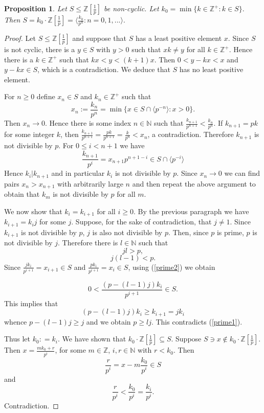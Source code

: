 \documentclass[11 pt, leqno, hidelinks]{amsart}%
\theoremstyle{plain}
\newtheorem{proposition}[theorem]{Proposition}
\numberwithin{equation}{section}
\newcommand{\N}{\mathbb{N}}
\newcommand{\Z}{\mathbb{Z}}
\begin{document}
\begin{proposition}\label{prime} Let $S\leq \mathbb Z[\frac{1}{p}]$ be non-cyclic.  Let $k_0=\min\{ k\in \Z^+: k\in S \}.$  Then $S=k_0\cdot \mathbb Z[\frac{1}{p}] = \langle  \frac{k_0}{p^n}:n=0,1,... \rangle.$
\end{proposition}
\begin{proof} Let $S\leq \mathbb Z[\frac{1}{p}]$ and suppose that $S$ has a least positive element $x$. Since $S$ is not cyclic, there is a $y\in S$ with $y>0$ such that $xk\neq y$ for all $k\in\Z^+.$  Hence there is a $k\in \Z^+$ such that $kx<y<(k+1)x.$  Then $0<y-kx<x$ and $y-kx\in S$, which is a contradiction.  We deduce that $S$ has no least positive element.

For $n\geq 0$ define $x_n\in S$ and $k_n\in\Z^+$ such that
\begin{equation*}
x_n:=\frac{k_n}{p^n} = \min\{  x\in S\cap \langle p^{-n} \rangle:x>0 \}.
\end{equation*}
Then $x_n\to 0 .$ Hence there is some index $n\in \N$ such that $\frac{k_{n+1}}{p^{n+1}}<\frac{k_n}{p^n}.$  If $k_{n+1}=pk$ for some integer $k$, then $\frac{k_{n+1}}{p^{n+1}}=\frac{pk}{p^{n+1}}=\frac{k}{p^n}<x_n$, a contradiction. Therefore $k_{n+1}$ is not divisible by $p$.
For $0\leq i<n+1$ we have
\begin{equation*}
\frac{k_{n+1}}{p^i}=x_{n+1}p^{n+1-i}\in S\cap \langle p^{-i} \rangle
\end{equation*}
Hence $k_i|k_{n+1}$ and in particular $k_i$ is not divisible by $p$.  Since $x_n\rightarrow 0$ we can find pairs $x_n>x_{n+1}$ with arbitrarily large $n$  and then repeat the above argument to obtain that $k_m$ is not divisible by $p$ for all $m$.



We now show that $k_i=k_{i+1}$ for all $i\geq 0.$
By the previous paragraph we have $k_{i+1}=k_ij$ for some $j.$  Suppose, for the sake of contradiction, that $j\neq 1$.  Since $k_{i+1}$ is not divisible by $p$, $j$ is also not divisible by $p$.  Then, since $p$ is prime, $p$ is not divisible by $j$. Therefore there is $l\in \mathbb N$ such that
\begin{equation}\label{prime1} jl > p,
\end{equation}
\begin{equation}\label{prime2} j(l-1) < p.
\end{equation}
Since $\frac{jk_i}{p^{i+1}} = x_{i+1}\in S$ and $\frac{pk_i}{p^{i+1}} = x_i\in S$, using (\ref{prime2}) we obtain

$$0<\frac{(p-(l-1)j)k_i}{p^{i+1}} \in S.$$
This implies that
$$(p-(l-1)j)k_i \ge k_{i+1} = jk_i$$ whence  $p - (l-1)j \ge j$ and we obtain $p\ge lj$. This contradicts (\ref{prime1}).

Thus let $k_0: = k_i$. We have shown that $k_0\cdot \mathbb Z[\frac{1}{p}] \subseteq S$. Suppose $S\ni x \notin k_0\cdot \mathbb Z[\frac{1}{p}]$. Then $x = \frac{mk_0+r}{p^i}$, for some $m\in \mathbb Z$, $i, r\in \mathbb N$ with $r<k_0$. Then
$$\frac{r}{p^i} = x - m \frac{k_0}{p^i} \in S $$ and $$\frac{r}{p^i}<\frac{k_0}{p^i} = \frac{k_i}{p^i}.$$ Contradiction.
\end{proof}
\end{document}

